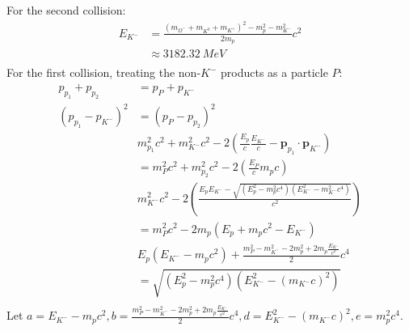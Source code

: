 \documentclass{article}
\begin{document}
For the second collision:
\begin{equation}
    \begin{split}
        E_{K^-} & = \frac{\left(m_{\Omega^-} + m_{K^0} + m_{K^+}\right)^2 - m_p^2 - m_{K^-}^2}{2m_p}c^2 \\
        & \approx 3182.32~\unit{MeV} \\
    \end{split}
\end{equation}
For the first collision, treating the non-$K^-$ products as a particle $P$:
\begin{equation}
    \begin{split}
        p_{p_1} + p_{p_2} & = p_P + p_{K^-} \\
        \left(p_{p_1} - p_{K^-}\right)^2 & = \left(p_P - p_{p_2}\right)^2 \\
        & m_{p_1}^2c^2 + m_{K^-}^2c^2 -2\left(\frac{E_p}{c}\frac{E_{K^-}}{c} - \mathbf{p}_{p_1} \cdot \mathbf{p}_{K^-}\right) \\
        & = m_{P}^2c^2 + m_{p_2}^2c^2 -2\left(\frac{E_P}{c}m_pc\right) \\
        & m_{K^-}^2c^2 -2\left(\frac{E_pE_{K^-} - \sqrt{\left(E_p^2 - m_p^2c^4\right)\left(E_{K^-}^2 - m_{K^-}^2c^4\right)}}{c^2}\right) \\
        & = m_{P}^2c^2 -2m_p(E_p + m_pc^2 - E_{K^-}) \\
        & E_p\left(E_{K^-} - m_pc^2\right) + \frac{m_{P}^2 - m_{K^-}^2 - 2m_p^2 + 2m_p\frac{E_{K^-}}{c^2}}{2}c^4 \\
        & = \sqrt{\left(E_p^2 - m_p^2c^4\right)\left(E_{K^-}^2 - (m_{K^-}c)^2\right)} \\
    \end{split}
\end{equation}
Let $a = E_{K^-} - m_pc^2, b = \frac{m_{P}^2 - m_{K^-}^2 - 2m_p^2 + 2m_p\frac{E_{K^-}}{c^2}}{2}c^4, d = E_{K^-}^2 - \left(m_{K^-}c\right)^2, e = m_p^2c^4$.
\end{document}

